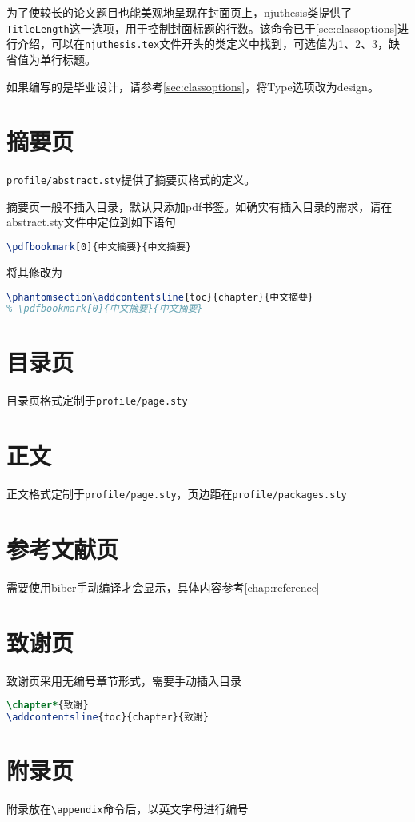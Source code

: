 为了使较长的论文题目也能美观地呈现在封面页上，njuthesis类提供了\texttt{TitleLength}这一选项，用于控制封面标题的行数。该命令已于\cref{sec:classoptions}进行介绍，可以在\texttt{njuthesis.tex}文件开头的类定义中找到，可选值为1、2、3，缺省值为单行标题。

如果编写的是毕业设计，请参考\cref{sec:classoptions}，将Type选项改为design。

\section{摘要页}

\texttt{profile/abstract.sty}提供了摘要页格式的定义。

摘要页一般不插入目录，默认只添加pdf书签。如确实有插入目录的需求，请在abstract.sty文件中定位到如下语句
\begin{lstlisting}[language=TeX]
% \phantomsection\addcontentsline{toc}{chapter}{中文摘要}
\pdfbookmark[0]{中文摘要}{中文摘要}
\end{lstlisting}
将其修改为
\begin{lstlisting}[language=TeX]
\phantomsection\addcontentsline{toc}{chapter}{中文摘要}
% \pdfbookmark[0]{中文摘要}{中文摘要}
\end{lstlisting}

\section{目录页}

目录页格式定制于\texttt{profile/page.sty}

\section{正文}

正文格式定制于\texttt{profile/page.sty}，页边距在\texttt{profile/packages.sty}

\section{参考文献页}

需要使用biber手动编译才会显示，具体内容参考\cref{chap:reference}

\section{致谢页}

致谢页采用无编号章节形式，需要手动插入目录
\begin{lstlisting}[language=TeX]
\chapter*{致谢}
\addcontentsline{toc}{chapter}{致谢}
\end{lstlisting}

\section{附录页}

附录放在\lstinline|\appendix|命令后，以英文字母进行编号
